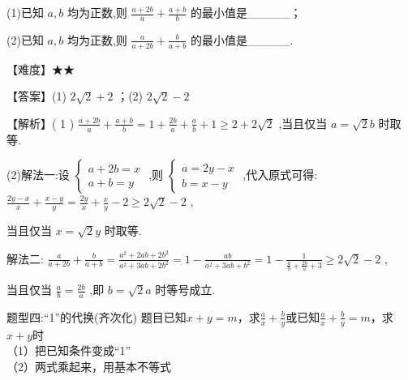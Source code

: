 \documentclass[11pt,a4paper]{article}
\begin{document}
\begin{problem} 
(1)已知 \(\displaystyle a,b\) 均为正数,则 \(\displaystyle \frac{a + {2b}}{a} + \frac{a + b}{b}\) 的最小值是\_\_\_\_\_；

(2)已知 \(\displaystyle a,b\) 均为正数,则 \(\displaystyle \frac{a}{a + {2b}} + \frac{b}{a + b}\) 的最小值是\_\_\_\_\_.
\begin{jiexi}
【难度】★★

【答案】(1) \(\displaystyle 2\sqrt{2} + 2\) ；(2) \(\displaystyle 2\sqrt{2} - 2\)

【解析】( 1 ) \(\displaystyle \frac{a + {2b}}{a} + \frac{a + b}{b} = 1 + \frac{2b}{a} + \frac{a}{b} + 1 \geq  2 + 2\sqrt{2}\) ,当且仅当 \(\displaystyle a = \sqrt{2}b\) 时取等.

(2)解法一:设 \(\displaystyle \left\{  \begin{array}{l} a + {2b} = x \\  a + b = y \end{array}\right.\) ,则 \(\displaystyle \left\{  \begin{array}{l} a = {2y} - x \\  b = x - y \end{array}\right.\) ,代入原式可得: \(\displaystyle \frac{{2y} - x}{x} + \frac{x - y}{y} = \frac{2y}{x} + \frac{x}{y} - 2 \geq  2\sqrt{2} - 2\) ,

当且仅当 \(\displaystyle x = \sqrt{2}y\) 时取等.

解法二: \(\displaystyle \frac{a}{a + {2b}} + \frac{b}{a + b} = \frac{{a}^{2} + {2ab} + 2{b}^{2}}{{a}^{2} + {3ab} + 2{b}^{2}} = 1 - \frac{ab}{{a}^{2} + {3ab} + {b}^{2}} = 1 - \frac{1}{\frac{a}{b} + \frac{2b}{a} + 3} \geq  2\sqrt{2} - 2\) ,

当且仅当 \(\displaystyle \frac{a}{b} = \frac{2b}{a}\) ,即 \(\displaystyle b = \sqrt{2}a\) 时等号成立.


\end{jiexi}
\end{problem}
\begin{tcolorbox} 
    \centering
    题型四:“1”的代换(齐次化)
    \tcblower %
    题目已知$x+y=m$，求$\displaystyle \frac{a}{x}+\frac{b}{y}$\quad 或\quad 已知$\displaystyle \frac{a}{x}+\frac{b}{y}=m$，求$x+y$时\\
    （1）把已知条件变成“1” \\
    （2）两式乘起来，用基本不等式
\end{tcolorbox}
\end{document}
